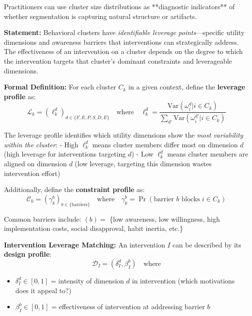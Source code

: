 \begin{tcolorbox}[colback=gray!5!white, colframe=gray!75!black,
    title=Axiom SEG-EMERGE-7: Natural Distribution of Cluster Sizes Under Heterogeneity]
Practitioners can use cluster size distributions as **diagnostic indicators** of
whether segmentation is capturing natural structure or artifacts.

\end{tcolorbox}

\begin{tcolorbox}[colback=red!5!white, colframe=red!75!black,
    title=Axiom SEG-MATCH-8: Intervention Leverage Principle]

\textbf{Statement:}
Behavioral clusters have \textit{identifiable leverage points}---specific utility dimensions
and awareness barriers that interventions can strategically address. The effectiveness of
an intervention on a cluster depends on the degree to which the intervention targets
that cluster's dominant constraints and leverageable dimensions.

\textbf{Formal Definition:}
For each cluster $C_k$ in a given context, define the \textbf{leverage profile} as:
\begin{equation}
\mathcal{L}_k = (\ell_k^d)_{d \in \{F,E,P,S,D,E\}} \quad \text{where} \quad \ell_k^d = \frac{\text{Var}(\omega_i^d | i \in C_k)}{\sum_{d'} \text{Var}(\omega_i^{d'} | i \in C_k)}
\end{equation}

The leverage profile identifies which utility dimensions show the \textit{most variability within the cluster}:
- High $\ell_k^d$ means cluster members differ most on dimension $d$ (high leverage for interventions targeting $d$)
- Low $\ell_k^d$ means cluster members are aligned on dimension $d$ (low leverage, targeting this dimension wastes intervention effort)

Additionally, define the \textbf{constraint profile} as:
\begin{equation}
\mathcal{C}_k = (\gamma_k^b)_{b \in \{\text{barriers}\}} \quad \text{where} \quad \gamma_k^b = \Pr(\text{barrier } b \text{ blocks } i \in C_k)
\end{equation}

Common barriers include: $(b) =$ \{low awareness, low willingness, high implementation costs, social disapproval, habit inertia, etc.\}

\textbf{Intervention Leverage Matching:}
An intervention $I$ can be described by its \textbf{design profile}:
\begin{equation}
\mathcal{D}_I = (\delta_I^d, \beta_I^b) \quad \text{where}
\end{equation}
\begin{itemize}[nosep]
\item $\delta_I^d \in [0,1]$ = intensity of dimension $d$ in intervention (which motivations does it appeal to?)
\item $\beta_I^b \in [0,1]$ = effectiveness of intervention at addressing barrier $b$
\end{itemize}


\end{tcolorbox}
